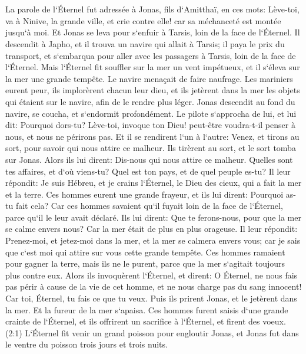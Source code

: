 

\chapter{}

\verse La parole de l`Éternel fut adressée à Jonas, fils d`Amitthaï, en ces mots: 
\verse Lève-toi, va à Ninive, la grande ville, et crie contre elle! car sa méchanceté est montée jusqu`à moi. 
\verse Et Jonas se leva pour s`enfuir à Tarsis, loin de la face de l`Éternel. Il descendit à Japho, et il trouva un navire qui allait à Tarsis; il paya le prix du transport, et s`embarqua pour aller avec les passagers à Tarsis, loin de la face de l`Éternel. 
\verse Mais l`Éternel fit souffler sur la mer un vent impétueux, et il s`éleva sur la mer une grande tempête. Le navire menaçait de faire naufrage. 
\verse Les mariniers eurent peur, ils implorèrent chacun leur dieu, et ils jetèrent dans la mer les objets qui étaient sur le navire, afin de le rendre plus léger. Jonas descendit au fond du navire, se coucha, et s`endormit profondément. 
\verse Le pilote s`approcha de lui, et lui dit: Pourquoi dors-tu? Lève-toi, invoque ton Dieu! peut-être voudra-t-il penser à nous, et nous ne périrons pas. 
\verse Et il se rendirent l`un à l`autre: Venez, et tirons au sort, pour savoir qui nous attire ce malheur. Ils tirèrent au sort, et le sort tomba sur Jonas. 
\verse Alors ils lui dirent: Dis-nous qui nous attire ce malheur. Quelles sont tes affaires, et d`où viens-tu? Quel est ton pays, et de quel peuple es-tu? 
\verse Il leur répondit: Je suis Hébreu, et je crains l`Éternel, le Dieu des cieux, qui a fait la mer et la terre. 
\verse Ces hommes eurent une grande frayeur, et ils lui dirent: Pourquoi as-tu fait cela? Car ces hommes savaient qu`il fuyait loin de la face de l`Éternel, parce qu`il le leur avait déclaré. 
\verse Ils lui dirent: Que te ferons-nous, pour que la mer se calme envers nous? Car la mer était de plus en plus orageuse. 
\verse Il leur répondit: Prenez-moi, et jetez-moi dans la mer, et la mer se calmera envers vous; car je sais que c`est moi qui attire sur vous cette grande tempête. 
\verse Ces hommes ramaient pour gagner la terre, mais ils ne le purent, parce que la mer s`agitait toujours plus contre eux. 
\verse Alors ils invoquèrent l`Éternel, et dirent: O Éternel, ne nous fais pas périr à cause de la vie de cet homme, et ne nous charge pas du sang innocent! Car toi, Éternel, tu fais ce que tu veux. 
\verse Puis ils prirent Jonas, et le jetèrent dans la mer. Et la fureur de la mer s`apaisa. 
\verse Ces hommes furent saisis d`une grande crainte de l`Éternel, et ils offrirent un sacrifice à l`Éternel, et firent des voeux. 
\verse (2:1) L`Éternel fit venir un grand poisson pour engloutir Jonas, et Jonas fut dans le ventre du poisson trois jours et trois nuits. 

